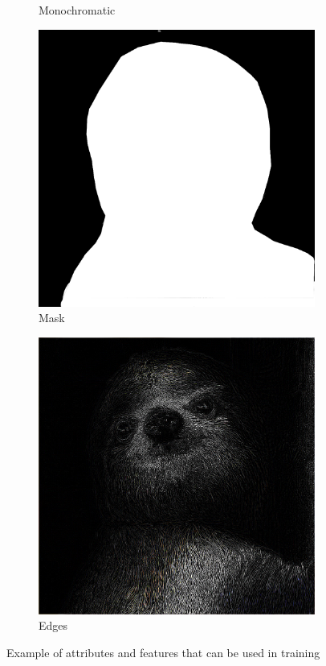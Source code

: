\begin{figure}[h]
\begin{subfigure}[b]{0.24\textwidth}
        \caption{Monochromatic}
    \end{subfigure}
    \begin{subfigure}[b]{0.24\textwidth}
        \centering
        \includegraphics[width=\textwidth]{img/ch4/mask.png}
        \caption{Mask \newline}
    \end{subfigure}
    \begin{subfigure}[b]{0.24\textwidth}
        \centering
        \includegraphics[width=\textwidth]{img/ch4/edges.png}
        \caption{Edges \newline}
    \end{subfigure}
    \caption{Example of attributes and features that can be used in training}
    \label{f:ex-signal-attributes}
\end{figure}


